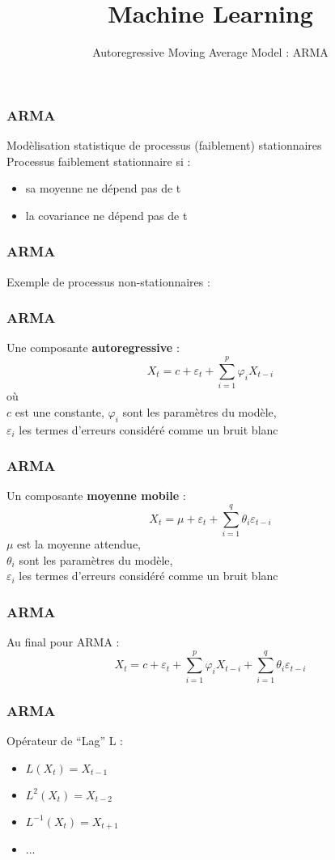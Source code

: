 \documentclass{formation}
\title{Machine Learning}
\subtitle{Autoregressive Moving Average Model : ARMA}
\begin{document}
\maketitle

\begin{frame}
  \frametitle{ARMA}
  Modèlisation statistique de processus (faiblement) stationnaires \\
  \newline
  Processus faiblement stationnaire si :
  \begin{itemize}
    \item sa moyenne ne dépend pas de t
    \item la covariance ne dépend pas de t
  \end{itemize}
\end{frame}

\begin{frame}
  \frametitle{ARMA}
  Exemple de processus non-stationnaires :
\end{frame}

\begin{frame}
  \frametitle{ARMA}
  Une composante \textbf{autoregressive} : \\
  \[
  X_{t}=c+\varepsilon _{t}+\sum _{i=1}^{p}\varphi _{i}X_{t-i}
  \]
  où \\
  $c$ est une constante, 
  $\varphi_i$ sont les paramètres du modèle, \\
  $\varepsilon_i$ les termes d'erreurs considéré comme un bruit blanc
\end{frame}

\begin{frame}
  \frametitle{ARMA}
  Un composante \textbf{moyenne mobile} : \\
  \[
  X_{t}=\mu +\varepsilon _{t}+\sum _{i=1}^{q}\theta _{i}\varepsilon _{t-i}
  \]
  $\mu$ est la moyenne attendue, \\
  $\theta_i$ sont les paramètres du modèle, \\
  $\varepsilon_i$ les termes d'erreurs considéré comme un bruit blanc
\end{frame}

\begin{frame}
  \frametitle{ARMA}
  Au final pour ARMA : \\
  \[
  X_{t}=c +\varepsilon _{t}+\sum _{i=1}^{p}\varphi _{i}X_{t-i}+\sum _{i=1}^{q}\theta _{i}\varepsilon _{t-i}
  \]
\end{frame}

\begin{frame}
  \frametitle{ARMA}
  Opérateur de ``Lag'' L : \\
  \begin{itemize}
  \item $L(X_{t}) = X_{t-1}$
  \item $L^2(X_{t}) = X_{t-2}$
  \item $L^{-1}(X_{t}) = X_{t+1}$
  \item ...
  \end{itemize}
\end{frame}
\end{document}
